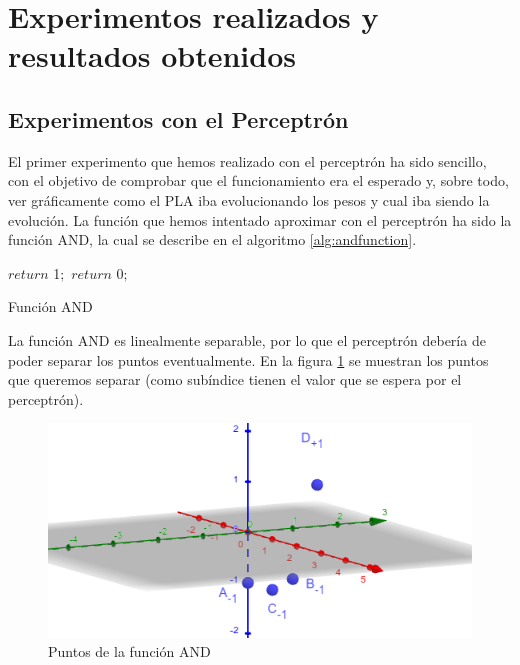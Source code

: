 \section{Experimentos realizados y resultados obtenidos}
\subsection{Experimentos con el Perceptrón}
\label{subsec:perceptronexperiment}

El primer experimento que hemos realizado con el perceptrón ha sido sencillo, con el objetivo de comprobar que el funcionamiento era el esperado y, sobre todo, ver gráficamente como el PLA iba evolucionando los pesos y cual iba siendo la evolución. La función que hemos intentado aproximar con el perceptrón ha sido la función AND, la cual se describe en el algoritmo \ref{alg:andfunction}.

\begin{algorithm}
    
    {
        $return$ 1$;$
    }
    {
        $return$ 0$;$
    }

	\caption{Función AND}
	\label{alg:andfunction}
\end{algorithm}

La función AND es linealmente separable, por lo que el perceptrón debería de poder separar los puntos eventualmente. En la figura \ref{fig:andFunctionTargets} se muestran los puntos que queremos separar (como subíndice tienen el valor que se espera por el perceptrón).

\begin{figure}[h]
	\centering
	\includegraphics[width=1\textwidth]{Figures/PerceptronTargets}
	\caption{Puntos de la función AND}
	\label{fig:andFunctionTargets}
\end{figure}


\setlength{\tabcolsep}{5pt}

